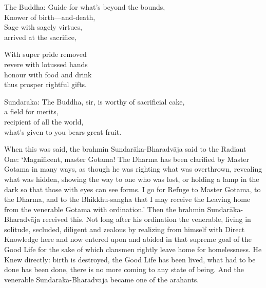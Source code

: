 \begin{MyDescription}{The Buddha:}
Guide for what's beyond the bounds,\\
Knower of birth—and-death,\\
Sage with sagely virtues,\\
arrived at the sacrifice,
\end{MyDescription}

\begin{MyDescription}{}
With super pride removed\\
revere with lotussed hands\\
honour with food and drink\\
thus prosper rightful gifts.
\end{MyDescription}

\begin{MyDescription}{Sundaraka:}
The Buddha, sir, is worthy of sacriﬁcial cake,\\
a ﬁeld for merits,\\
recipient of all the world,\\
what's given to you bears great fruit.
\end{MyDescription}

When this was said, the brahmin Sundar\=aka-Bharadv\=aja said to the Radiant
   One: `Magniﬁcent, master Gotama! The Dharma has been clarified by Master
   Gotama in many ways, as though he was righting what was overthrown, revealing
   what was hidden, showing the way to one who was lost, or holding a lamp in the
   dark so that those with eyes can see forms. I go for Refuge to Master Gotama, to
   the Dharma, and to the Bhikkhu-sangha that I may receive the Leaving home
   from the venerable Gotama with ordination.' Then the brahmin Sundar\=aka-
   Bharadv\=aja received this. Not long after his ordination the venerable, living in
   solitude, secluded, diligent and zealous by realizing from himself with Direct
   Knowledge here and now entered upon and abided in that supreme goal of the
   Good Life for the sake of which clansmen rightly leave home for homelessness.
   He Knew directly: birth is destroyed, the Good Life has been lived, what had to be done has been done, there is no more coming to any state of being. And the venerable Sundar\=aka-Bharadv\=aja became one of the arahants.

\begin{MyDescription}[(Sn. 455-486)]{}

\end{MyDescription}   


